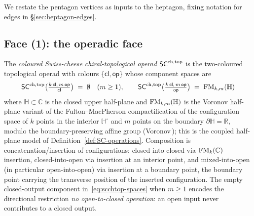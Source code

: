 We restate the pentagon vertices as inputs to the heptagon, fixing
notation for edges in \S\ref{sec:heptagon-edges}.

\subsection{Face (1): the operadic face}\label{subsec:face-operadic}

\begin{definition}\label{def:factorization-swiss-cheese-operad}%
The \emph{coloured Swiss-cheese chiral-topological operad} $\mathsf{SC}^{\mathrm{ch},\mathrm{top}}$
is the two-coloured topological operad with colours $\{\mathsf{cl},
\mathsf{op}\}$ whose component spaces are
\begin{equation}\label{eq:scchtop-spaces}
 \mathsf{SC}^{\mathrm{ch},\mathrm{top}}\bigl(\tfrac{k\,\mathsf{cl},\,m\,\mathsf{op}}{\mathsf{cl}}\bigr)
 \;=\;\emptyset\quad(m\geq 1),\qquad
 \mathsf{SC}^{\mathrm{ch},\mathrm{top}}\bigl(\tfrac{k\,\mathsf{cl},\,m\,\mathsf{op}}{\mathsf{op}}\bigr)
 \;=\;\mathrm{FM}_{k,m}(\mathbb{H})
\end{equation}
where $\mathbb{H}\subset\mathbb{C}$ is the closed upper half-plane
and $\mathrm{FM}_{k,m}(\mathbb{H})$ is the Voronov half-plane variant of the
Fulton--MacPherson compactification of the configuration space of
$k$ points in the interior $\mathbb{H}^\circ$ and $m$ points on the
boundary $\partial\mathbb{H}=\mathbb{R}$, modulo the
boundary-preserving affine group
(Voronov\,\cite{Voronov1998}); this is the coupled half-plane model
of Definition~\ref{def:SC-operations}.
Composition is concatenation/insertion of configurations:
closed-into-closed via $\mathrm{FM}_k(\mathbb{C})$ insertion,
closed-into-open via insertion at an interior point, and
mixed-into-open (in particular open-into-open) via insertion at a
boundary point, the boundary point carrying the transverse position
of the inserted configuration. The empty closed-output component
in~\eqref{eq:scchtop-spaces} when $m\geq 1$ encodes the directional
restriction \emph{no open-to-closed operation}: an open input never
contributes to a closed output.


\end{definition}

